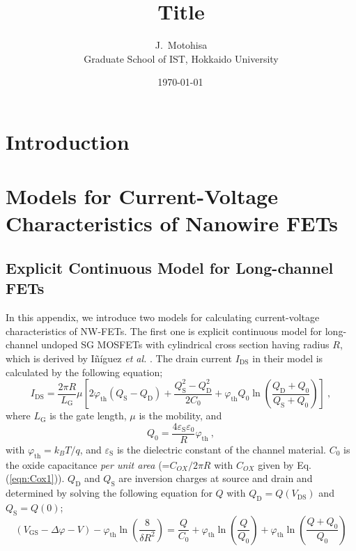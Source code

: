 \documentclass[11pt,uplatex,a4paper]{jsarticle}
\begin{document}
\title{Title}
\author{J.~Motohisa\\Graduate School of IST, Hokkaido University}
\date{\shortdate\today \, \ampmtime }
\maketitle

\section{Introduction}
\section{Models for Current-Voltage Characteristics of Nanowire FETs}
\label{sec:ivmodel}
\subsection{Explicit Continuous Model for Long-channel FETs}
In this appendix, we introduce two models for calculating current-voltage characteristics of NW-FETs.
The first one is explicit continuous model for long-channel undoped SG MOSFETs with
cylindrical cross section having radius $R$, which is derived by I\~n\'iguez \textit{et al.} \cite{Iniguez:2005ub}.
The drain current $I_{\mathrm{DS}}$ in their model is calculated by the following equation; 
\begin{equation}
 I_{\mathrm{DS}} = \frac{2 \pi R}{L_{\mathrm{G}}} \mu
  \left[
   2 \varphi_{\mathrm{th}} (Q_{\mathrm{S}} - Q_{\mathrm{D}}) + \frac{Q_{\mathrm{S}}^2-Q_{\mathrm{D}}^2}{2 C_0}
   + \varphi_{\mathrm{th}} Q_0 \ln \left(\frac{Q_{\mathrm{D}} + Q_0}{Q_{\mathrm{S}}+Q_0}\right) 
  \right] \ , 
\end{equation}
where $L_{\mathrm{G}}$ is the gate length, $\mu$ is the mobility, and
\begin{equation}
Q_0=\frac{4 \varepsilon_{\mathrm{S}} \varepsilon_0}{R}\varphi_{\mathrm{th}} \ ,
\end{equation}
with $\varphi_{\mathrm{th}} = {k_B T}/{q}$,
and $\varepsilon_{\mathrm{S}}$ is the dielectric constant of the channel material.
$C_0$ is the oxide capacitance \textit{per unit area} (=$C_{OX}/2\pi R$ with $C_{OX}$ given by Eq. (\ref{eqn:Cox1})).
$Q_{\mathrm{D}}$ and $Q_{\mathrm{S}}$ are inversion charges at source and drain and determined by solving the following equation for $Q$
with $Q_{\mathrm{D}} = Q(V_{\mathrm{DS}})$ and $Q_{\mathrm{S}}=Q(0)$;
\begin{equation}
 (V_{\mathrm{GS}} - \Delta \varphi -V) - \varphi_{\mathrm{th}}
  \ln \left(\frac{8}{\delta R^2}\right)
  = \frac{Q}{C_0} + \varphi_{\mathrm{th}} \ln \left(\frac{Q}{Q_0}\right) +
  \varphi_{\mathrm{th}} \ln \left(\frac{Q+Q_0}{Q_0}\right)
\end{equation}
\end{document}

